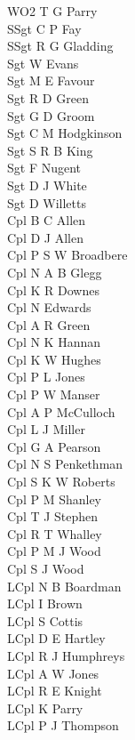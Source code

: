 \begin{multicols}{3}
  \small
  \noindent
  WO2 T G Parry \\
  SSgt C P Fay \\
  SSgt R G Gladding \\
  Sgt W Evans \\
  Sgt M E Favour \\
  Sgt R D Green \\
  Sgt G D Groom \\
  Sgt C M Hodgkinson \\
  Sgt S R B King \\
  Sgt F Nugent \\
  Sgt D J White \\
  Sgt D Willetts \\
  Cpl B C Allen \\
  Cpl D J Allen \\
  Cpl P S W Broadbere \\
  Cpl N A B Glegg \\
  Cpl K R Downes \\
  Cpl N Edwards \\
  Cpl A R Green \\
  Cpl N K Hannan \\
  Cpl K W Hughes \\
  Cpl P L Jones \\
  Cpl P W Manser \\
  Cpl A P McCulloch \\
  Cpl L J Miller \\
  Cpl G A Pearson \\
  Cpl N S Penkethman \\
  Cpl S K W Roberts \\
  Cpl P M Shanley \\
  Cpl T J Stephen \\
  Cpl R T Whalley \\
  Cpl P M J Wood \\
  Cpl S J Wood \\
  LCpl N B Boardman \\
  LCpl I Brown \\
  LCpl S Cottis \\
  LCpl D E Hartley \\
  LCpl R J Humphreys \\
  LCpl A W Jones \\
  LCpl R E Knight \\
  LCpl K Parry \\
  LCpl P J Thompson \\

\end{multicols}
